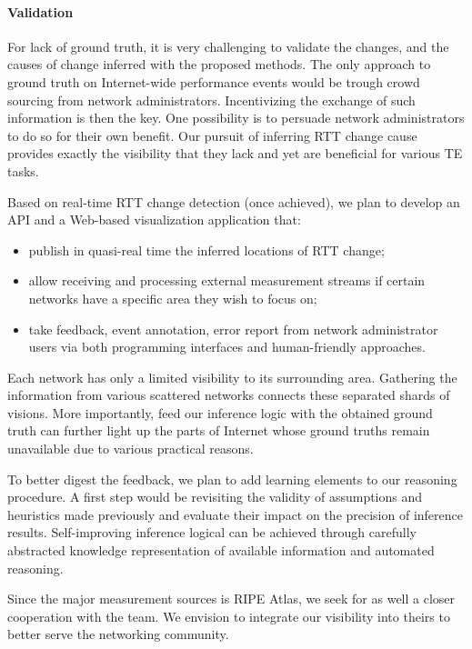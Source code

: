 \paragraph*{Validation} For lack of ground truth, it is very challenging to validate the changes, and the causes of change inferred with the proposed methods. The only approach to ground truth on Internet-wide performance events would be trough crowd sourcing from network administrators.
Incentivizing the exchange of such information is then the key.
One possibility is to persuade network administrators to do so for their own benefit.
Our pursuit of inferring RTT change cause provides exactly the visibility that they lack and yet are beneficial for various TE tasks.

Based on real-time RTT change detection (once achieved), we plan to develop an API and a Web-based visualization application that:
\begin{itemize}
\item publish in quasi-real time the inferred locations of RTT change;
\item allow receiving and processing external measurement streams if certain networks have a specific area they wish to focus on;
\item take feedback, event annotation, error report from network administrator users via both programming interfaces and human-friendly approaches. 
\end{itemize}
Each network has only a limited visibility to its surrounding area. Gathering the information from various scattered networks connects these separated shards of visions. More importantly, feed our inference logic with the obtained ground truth can further light up the parts of Internet whose ground truths remain unavailable due to various practical reasons.

To better digest the feedback, we plan to add learning elements to our reasoning procedure. A first step would be revisiting the validity of assumptions and heuristics made previously and evaluate their impact on the precision of inference results. Self-improving inference logical can be achieved through carefully abstracted knowledge representation of available information and automated reasoning.

Since the major measurement sources is RIPE Atlas, we seek for as well a closer cooperation with the team. We envision to integrate our visibility into theirs to better serve the networking community.

